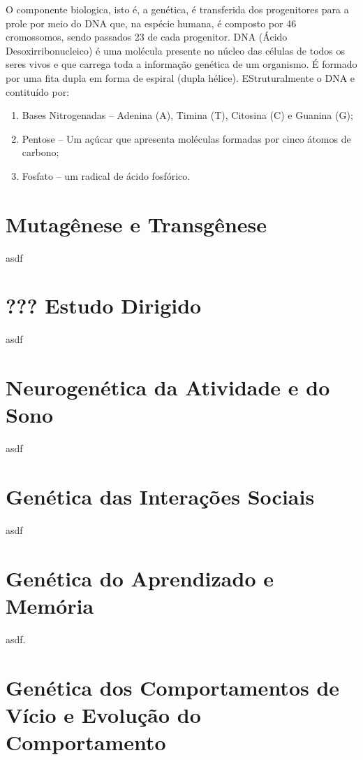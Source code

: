 \documentclass[
	article,			%
	12pt,				%
	oneside,			%
	a4paper,			%
	english,			%
	brazil,				%
	sumario=tradicional
	]{abntex2}
\begin{document}
O componente biologica, isto é, a genética, é transferida dos progenitores para a prole por meio do DNA que, na espécie humana, é composto por 46 cromossomos, sendo passados 23 de cada progenitor.
DNA  (Ácido Desoxirribonucleico) é uma molécula presente no núcleo das células de todos os seres vivos e que carrega toda a informação genética de um organismo. É formado por uma fita dupla em forma de espiral (dupla hélice).
EStruturalmente o DNA e contituído por:
\begin{enumerate}
    
    \item Bases Nitrogenadas – Adenina (A), Timina (T), Citosina (C) e Guanina (G);
    \item Pentose – Um açúcar que apresenta moléculas formadas por cinco átomos de carbono;
    \item Fosfato – um radical de ácido fosfórico.

\end{enumerate}







\section{Mutagênese e Transgênese}
\label{mutagenesetransgenese}
asdf

\section{??? Estudo Dirigido}
\label{...}
asdf

\section{Neurogenética da Atividade e do Sono}
\label{neurogenetica}
asdf

\section{Genética das Interações Sociais}
\label{geneticadasinteracoes}
asdf

\section{Genética do Aprendizado e Memória}
\label{geneticadoaprendizado}
asdf.

\section{Genética dos Comportamentos de Vício e Evolução do Comportamento}
\label{viciosecomportamento}
\end{document}
